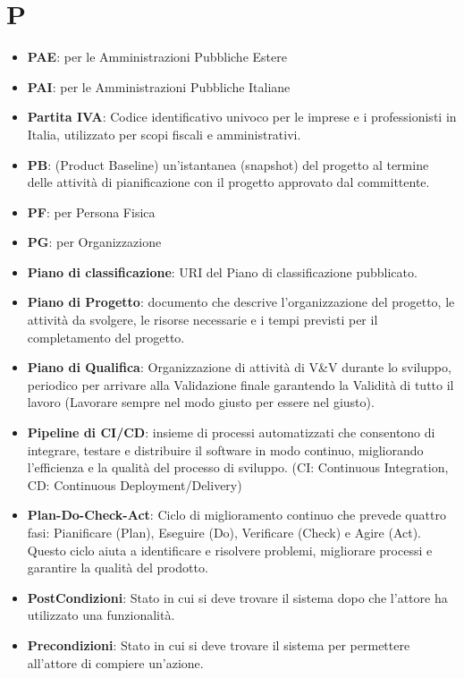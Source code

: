\documentclass[a4paper,12pt]{article}
\begin{document}
\section{P}
\begin{itemize}
    \item \textbf{PAE}: per le Amministrazioni Pubbliche Estere
    \item \textbf{PAI}: per le Amministrazioni Pubbliche Italiane
    \item \textbf{Partita IVA}: Codice identificativo univoco per le imprese e i professionisti in Italia, utilizzato per scopi fiscali e amministrativi.
    \item \textbf{PB}: (Product Baseline) un'istantanea (snapshot) del progetto al termine delle attività di pianificazione con il progetto approvato dal committente.
    \item \textbf{PF}: per Persona Fisica
    \item \textbf{PG}: per Organizzazione
    \item \textbf{Piano di classificazione}: URI del Piano di classificazione pubblicato.
    \item \textbf{Piano di Progetto}: documento che descrive l'organizzazione del progetto, le attività da svolgere, le risorse necessarie e i tempi previsti per il completamento del progetto. 
    \item \textbf{Piano di Qualifica}: Organizzazione di attività di V\&V durante lo sviluppo, periodico per arrivare alla Validazione finale garantendo la Validità di tutto il lavoro (Lavorare sempre nel modo giusto per essere nel giusto).
    \item \textbf{Pipeline di CI/CD}: insieme di processi automatizzati che consentono di integrare, testare e distribuire il software in modo continuo, migliorando l'efficienza e la qualità del processo di sviluppo. (CI: Continuous Integration, CD: Continuous Deployment/Delivery)
    \item \textbf{Plan-Do-Check-Act}: Ciclo di miglioramento continuo che prevede quattro fasi: Pianificare (Plan), Eseguire (Do), Verificare (Check) e Agire (Act). Questo ciclo aiuta a identificare e risolvere problemi, migliorare processi e garantire la qualità del prodotto.
    \item \textbf{PostCondizioni}: Stato in cui si deve trovare il sistema dopo che l'attore ha utilizzato una funzionalità.
    \item \textbf{Precondizioni}: Stato in cui si deve trovare il sistema per permettere all'attore di compiere un'azione.

\end{itemize}
\end{document}
